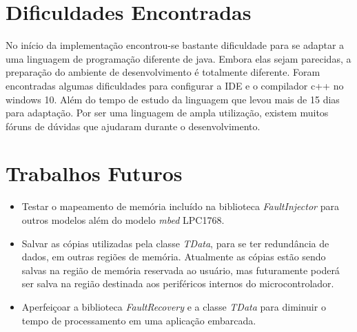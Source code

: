 \section{Dificuldades Encontradas}

No início da implementação encontrou-se bastante dificuldade para se adaptar a uma linguagem de programação diferente de java. Embora elas sejam parecidas, a preparação do ambiente de desenvolvimento é totalmente diferente. Foram encontradas algumas dificuldades para configurar a IDE e o compilador c++ no windows 10. Além do tempo de estudo da linguagem que levou mais de 15 dias para adaptação. Por ser uma linguagem de ampla utilização, existem muitos fóruns de dúvidas que ajudaram durante o desenvolvimento. 

\section{Trabalhos Futuros} \label{Sec:TrabalhosFuturos}

\begin{itemize}

\item Testar o mapeamento de memória incluído na biblioteca \textit{FaultInjector} para outros modelos além do modelo \textit{mbed} LPC1768.

\item Salvar as cópias utilizadas pela classe \textit{TData}, para se ter redundância de dados, em outras regiões de memória. Atualmente as cópias estão sendo salvas na região de memória reservada ao usuário, mas futuramente poderá ser salva na região destinada aos periféricos internos do microcontrolador. 

\item Aperfeiçoar a biblioteca \textit{FaultRecovery} e a classe \textit{TData} para diminuir o tempo de processamento em uma aplicação embarcada.

\end{itemize}
